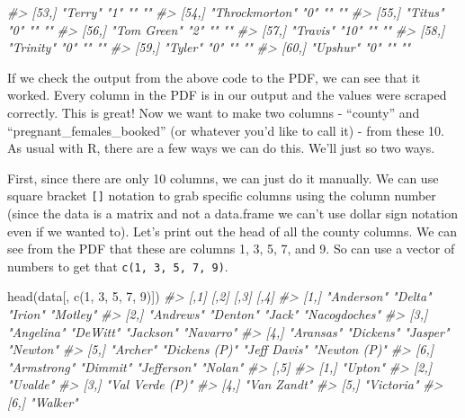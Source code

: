 \documentclass[
]{krantz}
\makeatletter
\newenvironment{Shaded}{\begin{snugshade}}{\end{snugshade}}
\newcommand{\CommentTok}[1]{\textcolor[rgb]{0.37,0.37,0.37}{\textit{#1}}}
\newcommand{\DecValTok}[1]{\textcolor[rgb]{0.06,0.06,0.06}{#1}}
\newcommand{\FunctionTok}[1]{\textcolor[rgb]{0,0,0}{#1}}
\newcommand{\NormalTok}[1]{#1}
\newenvironment{kframe}{%
\medskip{}
\setlength{\fboxsep}{.8em}
 \def\at@end@of@kframe{}%
 \ifinner\ifhmode%
  \def\at@end@of@kframe{\end{minipage}}%
  \begin{minipage}{\columnwidth}%
 \fi\fi%
 \def\FrameCommand##1{\hskip\@totalleftmargin \hskip-\fboxsep
 \colorbox{shadecolor}{##1}\hskip-\fboxsep
     \hskip-\linewidth \hskip-\@totalleftmargin \hskip\columnwidth}%
 \MakeFramed {\advance\hsize-\width
   \@totalleftmargin\z@ \linewidth\hsize
   \@setminipage}}%
 {\par\unskip\endMakeFramed%
 \at@end@of@kframe}
\renewenvironment{Shaded}{\begin{kframe}}{\end{kframe}}
\makeatother
\begin{document}
\begin{Shaded}
\begin{Highlighting}[]
\CommentTok{\#\textgreater{} [53,] "Terry"         "1"  ""              ""   }
\CommentTok{\#\textgreater{} [54,] "Throckmorton"  "0"  ""              ""   }
\CommentTok{\#\textgreater{} [55,] "Titus"         "0"  ""              ""   }
\CommentTok{\#\textgreater{} [56,] "Tom Green"     "2"  ""              ""   }
\CommentTok{\#\textgreater{} [57,] "Travis"        "10" ""              ""   }
\CommentTok{\#\textgreater{} [58,] "Trinity"       "0"  ""              ""   }
\CommentTok{\#\textgreater{} [59,] "Tyler"         "0"  ""              ""   }
\CommentTok{\#\textgreater{} [60,] "Upshur"        "0"  ""              ""}
\end{Highlighting}
\end{Shaded}

If we check the output from the above code to the PDF, we can see that it worked. Every column in the PDF is in our output and the values were scraped correctly. This is great! Now we want to make two columns - ``county'' and ``pregnant\_females\_booked'' (or whatever you'd like to call it) - from these 10. As usual with R, there are a few ways we can do this. We'll just so two ways.

First, since there are only 10 columns, we can just do it manually. We can use square bracket \texttt{{[}{]}} notation to grab specific columns using the column number (since the data is a matrix and not a data.frame we can't use dollar sign notation even if we wanted to). Let's print out the head of all the county columns. We can see from the PDF that these are columns 1, 3, 5, 7, and 9. So can use a vector of numbers to get that \texttt{c(1,\ 3,\ 5,\ 7,\ 9)}.

\begin{Shaded}
\begin{Highlighting}[]
\FunctionTok{head}\NormalTok{(data[, }\FunctionTok{c}\NormalTok{(}\DecValTok{1}\NormalTok{, }\DecValTok{3}\NormalTok{, }\DecValTok{5}\NormalTok{, }\DecValTok{7}\NormalTok{, }\DecValTok{9}\NormalTok{)])}
\CommentTok{\#\textgreater{}      [,1]        [,2]          [,3]         [,4]         }
\CommentTok{\#\textgreater{} [1,] "Anderson"  "Delta"       "Irion"      "Motley"     }
\CommentTok{\#\textgreater{} [2,] "Andrews"   "Denton"      "Jack"       "Nacogdoches"}
\CommentTok{\#\textgreater{} [3,] "Angelina"  "DeWitt"      "Jackson"    "Navarro"    }
\CommentTok{\#\textgreater{} [4,] "Aransas"   "Dickens"     "Jasper"     "Newton"     }
\CommentTok{\#\textgreater{} [5,] "Archer"    "Dickens (P)" "Jeff Davis" "Newton (P)" }
\CommentTok{\#\textgreater{} [6,] "Armstrong" "Dimmit"      "Jefferson"  "Nolan"      }
\CommentTok{\#\textgreater{}      [,5]           }
\CommentTok{\#\textgreater{} [1,] "Upton"        }
\CommentTok{\#\textgreater{} [2,] "Uvalde"       }
\CommentTok{\#\textgreater{} [3,] "Val Verde (P)"}
\CommentTok{\#\textgreater{} [4,] "Van Zandt"    }
\CommentTok{\#\textgreater{} [5,] "Victoria"     }
\CommentTok{\#\textgreater{} [6,] "Walker"}
\end{Highlighting}
\end{Shaded}
\end{document}
